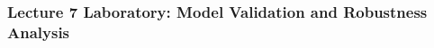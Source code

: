 \documentclass[journal]{IEEEtran}
\begin{document}



\medskip
\subsubsection{Lecture 7 Laboratory: Model Validation and Robustness Analysis} 



\end{document}
